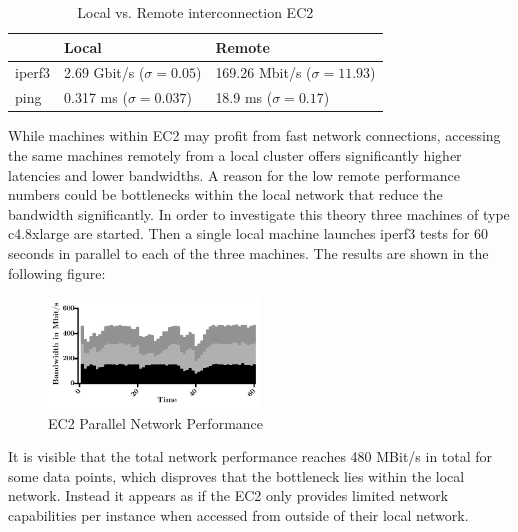 \begin{table}[!htb]
	\centering
	\begin{adjustbox}{width=0.5\textwidth}
		\small
		\begin{tabular}{l | l | l}
			~                     & Local                 				& Remote                  \\
			\hline
			iperf3                & 2.69 Gbit/s ($\sigma = 0.05$) 		& 169.26 Mbit/s ($\sigma = 11.93$) \\
			ping                  & 0.317 ms ($\sigma = 0.037$)  		& 18.9 ms ($\sigma = 0.17$)  \\
		\end{tabular}
	\end{adjustbox}
	
	\caption{Local vs. Remote interconnection EC2}
	\label{table:local_vs_remote_ec2}
\end{table}

While machines within EC2 may profit from fast network connections, accessing the same machines remotely from a local cluster offers significantly higher latencies and lower bandwidths. A reason for the low remote performance numbers could be bottlenecks within the local network that reduce the bandwidth significantly. In order to investigate this theory three machines of type c4.8xlarge are started. Then a single local machine launches iperf3 tests for 60 seconds in parallel to each of the three machines. The results are shown in the following figure:

\begin{figure}[H]
	\includegraphics[width=0.5\textwidth]{images/ec2_stacked_network_performance.pdf}
	\centering
	\caption{EC2 Parallel Network Performance}
	\label{img:EC2 Parallel Network Performance}
\end{figure}

It is visible that the total network performance reaches 480 MBit/s in total for some data points, which disproves that the bottleneck lies within the local network. Instead it appears as if the EC2 only provides limited network capabilities per instance when accessed from outside of their local network.

